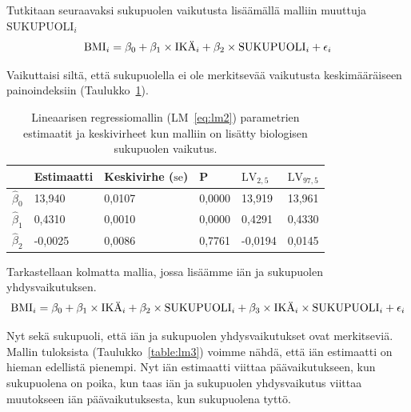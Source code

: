 \documentclass[finnish]{docopts}
\begin{document}
Tutkitaan seuraavaksi sukupuolen vaikutusta lisäämällä malliin muuttuja $\text{SUKUPUOLI}_i$\\

\begin{equation}
\text{BMI}_i = \beta_0 + \beta_1 \times \text{IKÄ}_i + \beta_2 \times \text{SUKUPUOLI}_i + \epsilon_i \label{eq:lm2}\\
\end{equation}

Vaikuttaisi siltä, että sukupuolella ei ole merkitsevää vaikutusta keskimääräiseen painoindeksiin (Taulukko~\ref{table:lm2}).\\

\begin{table}[H]
\centering
\begin{tabular}{llllll}
\toprule
  & Estimaatti & Keskivirhe ($\text{se}$) & P & $\text{LV}_{2,5}$ & $\text{LV}_{97,5}$\\
\midrule
$\hat{\beta}_0$ & 13,940 & 0,0107 & 0,0000 & 13,919 & 13,961\\
$\hat{\beta}_1$ & 0,4310 & 0,0010 & 0,0000 & 0,4291 & 0,4330\\
$\hat{\beta}_2$ & -0,0025 & 0,0086 & 0,7761 & -0,0194 & 0,0145\\
\bottomrule
\end{tabular}
\caption{Lineaarisen regressiomallin (LM~\ref{eq:lm2}) parametrien estimaatit ja keskivirheet kun malliin on lisätty biologisen sukupuolen vaikutus.}
\label{table:lm2}
\end{table}

Tarkastellaan kolmatta mallia, jossa lisäämme iän ja sukupuolen yhdysvaikutuksen.\\

\begin{equation}
\text{BMI}_i = \beta_0 + \beta_1 \times \text{IKÄ}_i + \beta_2 \times \text{SUKUPUOLI}_i + \beta_3 \times \text{IKÄ}_i \times \text{SUKUPUOLI}_i + \epsilon_i \label{eq:lm3}\\
\end{equation}

Nyt sekä sukupuoli, että iän ja sukupuolen yhdysvaikutukset ovat merkitseviä. Mallin tuloksista (Taulukko~\ref{table:lm3}) voimme nähdä, että iän estimaatti on hieman edellistä pienempi. Nyt iän estimaatti viittaa päävaikutukseen, kun sukupuolena on poika, kun taas iän ja sukupuolen yhdysvaikutus viittaa muutokseen iän päävaikutuksesta, kun sukupuolena tyttö.\\
\end{document}
